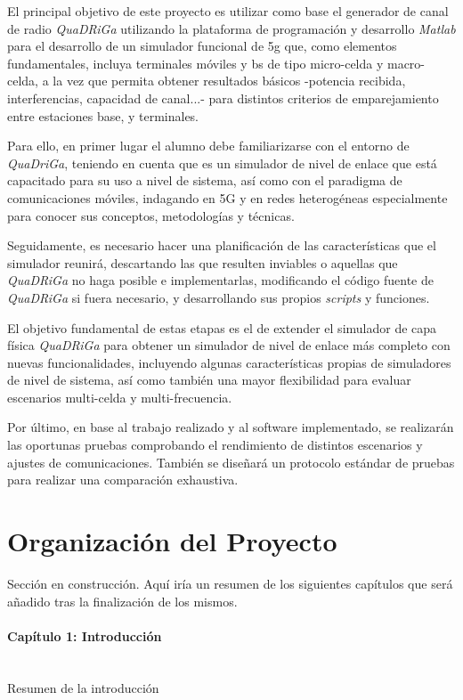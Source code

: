 El principal objetivo de este proyecto es utilizar como base el generador de canal de radio \textit{QuaDRiGa} utilizando la plataforma de programación y desarrollo \textit{Matlab} para el desarrollo de un simulador funcional de \acs{5g} que, como elementos fundamentales, incluya terminales móviles y \ac{bs} de tipo micro-celda y macro-celda, a la vez que permita obtener resultados básicos -potencia recibida, interferencias, capacidad de canal...- para distintos criterios de emparejamiento entre estaciones base, y terminales.

Para ello, en primer lugar el alumno debe familiarizarse con el entorno de \textit{QuaDriGa}, teniendo en cuenta que es un simulador de nivel de enlace que está capacitado para su uso a nivel de sistema, así como con el paradigma de comunicaciones móviles, indagando en 5G y en redes heterogéneas especialmente para conocer sus conceptos, metodologías y técnicas.

Seguidamente, es necesario hacer una planificación de las características que el simulador reunirá, descartando las que resulten inviables o aquellas que \textit{QuaDRiGa} no haga posible e implementarlas, modificando el código fuente de \textit{QuaDRiGa} si fuera necesario, y desarrollando sus propios \textit{scripts} y funciones.

El objetivo fundamental de estas etapas es el de extender el simulador de capa física \textit{QuaDRiGa} para obtener un simulador de nivel de enlace más completo con nuevas funcionalidades, incluyendo algunas características propias de simuladores de nivel de sistema, así como también una mayor flexibilidad para evaluar escenarios multi-celda y multi-frecuencia.

Por último, en base al trabajo realizado y al software implementado, se realizarán las oportunas pruebas comprobando el rendimiento de distintos escenarios y ajustes de comunicaciones. También se diseñará un protocolo estándar de pruebas para realizar una comparación exhaustiva.

\section{Organización del Proyecto}

Sección en construcción. Aquí iría un resumen de los siguientes capítulos que será añadido tras la finalización de los mismos.

\paragraph{Capítulo 1: Introducción} \mbox{} \\
	Resumen de la introducción


